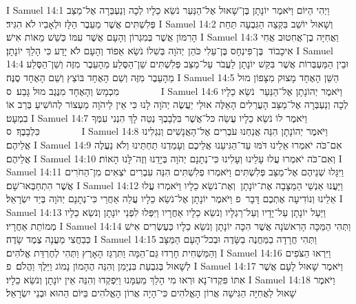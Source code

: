 I Samuel 14:1	וַיְהִי הַיּוֹם וַיֹּאמֶר יוֹנָתָן בֶּן־שָׁאוּל אֶל־הַנַּעַר נֹשֵׂא כֵלָיו לְכָה וְנַעְבְּרָה אֶל־מַצַּב פְּלִשְׁתִּים אֲשֶׁר מֵעֵבֶר הַלָּז וּלְאָבִיו לֹא הִגִּיד׃
I Samuel 14:2	וְשָׁאוּל יוֹשֵׁב בִּקְצֵה הַגִּבְעָה תַּחַת הָרִמּוֹן אֲשֶׁר בְּמִגְרוֹן וְהָעָם אֲשֶׁר עִמּוֹ כְּשֵׁשׁ מֵאוֹת אִישׁ׃
I Samuel 14:3	וַאֲחִיָּה בֶן־אֲחִטוּב אֲחִי אִיכָבוֹד  בֶּן־פִּינְחָס בֶּן־עֵלִי כֹּהֵן  יְהֹוָה בְּשִׁלוֹ נֹשֵׂא אֵפוֹד וְהָעָם לֹא יָדַע כִּי הָלַךְ יוֹנָתָן׃
I Samuel 14:4	וּבֵין הַמַּעְבְּרוֹת אֲשֶׁר בִּקֵּשׁ יוֹנָתָן לַעֲבֹר עַל־מַצַּב פְּלִשְׁתִּים שֵׁן־הַסֶּלַע מֵהָעֵבֶר מִזֶּה וְשֵׁן־הַסֶּלַע מֵהָעֵבֶר מִזֶּה וְשֵׁם הָאֶחָד בּוֹצֵץ וְשֵׁם הָאֶחָד סֶנֶּה׃
I Samuel 14:5	הַשֵּׁן הָאֶחָד מָצוּק מִצָּפוֹן מוּל מִכְמָשׂ וְהָאֶחָד מִנֶּגֶב מוּל גָּבַע׃ {ס}        
I Samuel 14:6	וַיֹּאמֶר יְהוֹנָתָן אֶל־הַנַּעַר  נֹשֵׂא כֵלָיו לְכָה וְנַעְבְּרָה אֶל־מַצַּב הָעֲרֵלִים הָאֵלֶּה אוּלַי יַעֲשֶׂה יְהֹוָה לָנוּ כִּי אֵין לַיהֹוָה מַעְצוֹר לְהוֹשִׁיעַ בְּרַב אוֹ בִמְעָט׃
I Samuel 14:7	וַיֹּאמֶר לוֹ נֹשֵׂא כֵלָיו עֲשֵׂה כּל־אֲשֶׁר בִּלְבָבֶךָ נְטֵה לָךְ הִנְנִי עִמְּךָ כִּלְבָבֶךָ׃ {ס}        
I Samuel 14:8	וַיֹּאמֶר יְהוֹנָתָן הִנֵּה אֲנַחְנוּ עֹבְרִים אֶל־הָאֲנָשִׁים וְנִגְלִינוּ אֲלֵיהֶם׃
I Samuel 14:9	אִם־כֹּה יֹאמְרוּ אֵלֵינוּ דֹּמּוּ עַד־הַגִּיעֵנוּ אֲלֵיכֶם וְעָמַדְנוּ תַחְתֵּינוּ וְלֹא נַעֲלֶה אֲלֵיהֶם׃
I Samuel 14:10	וְאִם־כֹּה יֹאמְרוּ עֲלוּ עָלֵינוּ וְעָלִינוּ כִּי־נְתָנָם יְהֹוָה בְּיָדֵנוּ וְזֶה־לָּנוּ הָאוֹת׃
I Samuel 14:11	וַיִּגָּלוּ שְׁנֵיהֶם אֶל־מַצַּב פְּלִשְׁתִּים וַיֹּאמְרוּ פְלִשְׁתִּים הִנֵּה עִבְרִים יֹצְאִים מִן־הַחֹרִים אֲשֶׁר הִתְחַבְּאוּ־שָׁם׃
I Samuel 14:12	וַיַּעֲנוּ אַנְשֵׁי הַמַּצָּבָה אֶת־יוֹנָתָן  וְאֶת־נֹשֵׂא כֵלָיו וַיֹּאמְרוּ עֲלוּ אֵלֵינוּ וְנוֹדִיעָה אֶתְכֶם דָּבָר {פ} וַיֹּאמֶר יוֹנָתָן אֶל־נֹשֵׂא כֵלָיו עֲלֵה אַחֲרַי כִּי־נְתָנָם יְהֹוָה בְּיַד יִשְׂרָאֵל׃
I Samuel 14:13	וַיַּעַל יוֹנָתָן עַל־יָדָיו וְעַל־רַגְלָיו וְנֹשֵׂא כֵלָיו אַחֲרָיו וַיִּפְּלוּ לִפְנֵי יוֹנָתָן וְנֹשֵׂא כֵלָיו מְמוֹתֵת אַחֲרָיו׃
I Samuel 14:14	וַתְּהִי הַמַּכָּה הָרִאשֹׁנָה אֲשֶׁר הִכָּה יוֹנָתָן וְנֹשֵׂא כֵלָיו כְּעֶשְׂרִים אִישׁ כְּבַחֲצִי מַעֲנָה צֶמֶד שָׂדֶה׃
I Samuel 14:15	וַתְּהִי חֲרָדָה בַמַּחֲנֶה בַשָּׂדֶה וּבְכל־הָעָם הַמַּצָּב וְהַמַּשְׁחִית חָרְדוּ גַּם־הֵמָּה וַתִּרְגַּז הָאָרֶץ וַתְּהִי לְחֶרְדַּת אֱלֹהִים׃
I Samuel 14:16	וַיִּרְאוּ הַצֹּפִים לְשָׁאוּל בְּגִבְעַת בִּנְיָמִן וְהִנֵּה הֶהָמוֹן נָמוֹג וַיֵּלֶךְ וַהֲלֹם׃ {פ}
I Samuel 14:17	וַיֹּאמֶר שָׁאוּל לָעָם אֲשֶׁר אִתּוֹ פִּקְדוּ־נָא וּרְאוּ מִי הָלַךְ מֵעִמָּנוּ וַיִּפְקְדוּ וְהִנֵּה אֵין יוֹנָתָן וְנֹשֵׂא כֵלָיו׃
I Samuel 14:18	וַיֹּאמֶר שָׁאוּל לַאֲחִיָּה הַגִּישָׁה אֲרוֹן הָאֱלֹהִים כִּי־הָיָה אֲרוֹן הָאֱלֹהִים בַּיּוֹם הַהוּא וּבְנֵי יִשְׂרָאֵל׃
